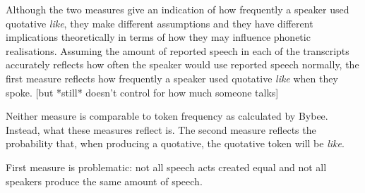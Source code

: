 Although the two measures give an indication of how frequently a speaker used quotative \textit{like}, they make different assumptions and they have different implications theoretically in terms of how they may influence phonetic realisations.  Assuming the amount of reported speech in each of the transcripts accurately reflects how often the speaker would use reported speech normally, the first measure reflects how frequently a speaker used quotative \textit{like} when they spoke. [but *still* doesn't control for how much someone talks]


Neither measure is comparable to token frequency as calculated by Bybee.  Instead, what these measures reflect is.  The second measure reflects the probability that, when producing a quotative, the quotative token will be \textit{like}.

First measure is problematic: not all speech acts created equal and not all speakers produce the same amount of speech.
